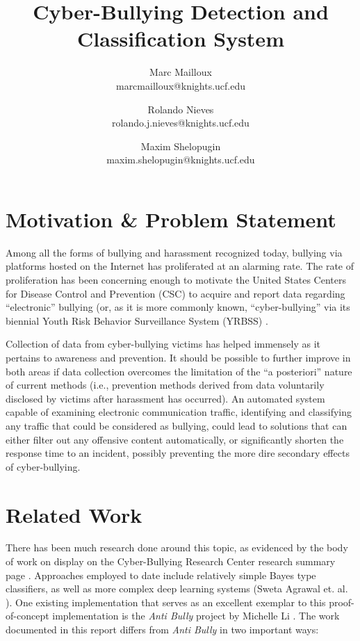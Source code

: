 \documentclass[conference]{sig-alternate-05-2015}
\begin{document}
\title{Cyber-Bullying Detection and Classification System}



\author{
  Marc Mailloux\\ marcmailloux@knights.ucf.edu
  \and Rolando Nieves\\ rolando.j.nieves@knights.ucf.edu
  \and Maxim Shelopugin\\ maxim.shelopugin@knights.ucf.edu
}

\maketitle


\section{Motivation \& Problem Statement}\label{sec:motivation}
Among all the forms of bullying and harassment recognized today, bullying via
platforms hosted on the Internet has proliferated at an alarming rate. The rate
of proliferation has been concerning enough to motivate the United States
Centers for Disease Control and Prevention (CSC) to acquire and report data
regarding ``electronic'' bullying (or, as it is more commonly known,
``cyber-bullying'' via its biennial Youth Risk Behavior Surveillance System
(YRBSS) \cite{CBRC_facts2018}.

Collection of data from cyber-bullying victims has helped immensely as it
pertains to awareness and prevention. It should be possible to further improve
in both areas if data collection overcomes the limitation of the
``a posteriori'' nature of current methods (i.e., prevention methods derived
from data voluntarily disclosed by victims after harassment has occurred). An
automated system capable of examining electronic communication traffic,
identifying and classifying any traffic that could be considered as bullying,
could lead to solutions that can either filter out any offensive content
automatically, or significantly shorten the response time to an incident,
possibly preventing the more dire secondary effects of cyber-bullying.


\section{Related Work}\label{sec:related}

There has been much research done around this topic, as evidenced by the body of
work on display on the Cyber-Bullying Research Center research summary page
\cite{CBRC_research2018}. Approaches employed to date include relatively
simple Bayes type classifiers, as well as more complex deep learning systems
(Sweta Agrawal et. al. \cite{agrawal2018deep}). One existing implementation that
serves as an excellent exemplar to this proof-of-concept implementation is the
\textit{Anti Bully} project by Michelle Li \cite{Li2016}. The work documented
in this report differs from \textit{Anti Bully} in two important ways:
\end{document}
